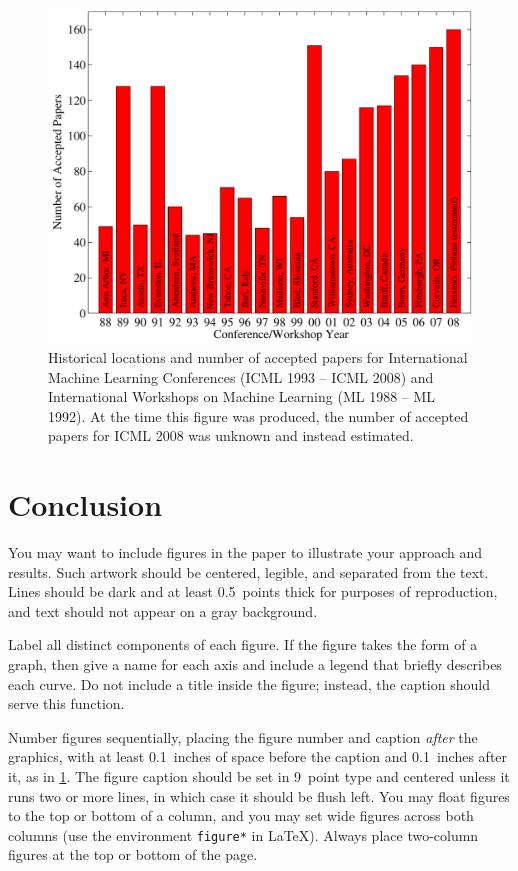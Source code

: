 \documentclass{article}
\theoremstyle{plain}
\theoremstyle{definition}
\theoremstyle{remark}
\begin{document}
\begin{figure}[ht]
\vskip 0.2in
\begin{center}
\centerline{\includegraphics[width=\columnwidth]{icml_numpapers}}
\caption{Historical locations and number of accepted papers for International
Machine Learning Conferences (ICML 1993 -- ICML 2008) and International
Workshops on Machine Learning (ML 1988 -- ML 1992). At the time this figure was
produced, the number of accepted papers for ICML 2008 was unknown and instead
estimated.}
\label{icml-historical}
\end{center}
\vskip -0.2in
\end{figure}

\section{Conclusion}

You may want to include figures in the paper to illustrate
your approach and results. Such artwork should be centered,
legible, and separated from the text. Lines should be dark and at
least 0.5~points thick for purposes of reproduction, and text should
not appear on a gray background.

Label all distinct components of each figure. If the figure takes the
form of a graph, then give a name for each axis and include a legend
that briefly describes each curve. Do not include a title inside the
figure; instead, the caption should serve this function.

Number figures sequentially, placing the figure number and caption
\emph{after} the graphics, with at least 0.1~inches of space before
the caption and 0.1~inches after it, as in
\cref{icml-historical}. The figure caption should be set in
9~point type and centered unless it runs two or more lines, in which
case it should be flush left. You may float figures to the top or
bottom of a column, and you may set wide figures across both columns
(use the environment \texttt{figure*} in \LaTeX). Always place
two-column figures at the top or bottom of the page.
\end{document}
